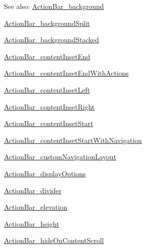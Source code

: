 \begin{Desc}
\item[See also:]\hyperlink{classandroid_1_1support_1_1v4_1_1_r_1_1styleable_7d91fb5bbb5c3d2bc5aec28f9ed002b4}{ActionBar\_\-background} 

\hyperlink{classandroid_1_1support_1_1v4_1_1_r_1_1styleable_94fcfd07399863e568786b26bbb3deed}{ActionBar\_\-backgroundSplit} 

\hyperlink{classandroid_1_1support_1_1v4_1_1_r_1_1styleable_afd1ae650dce54259899787ed8768401}{ActionBar\_\-backgroundStacked} 

\hyperlink{classandroid_1_1support_1_1v4_1_1_r_1_1styleable_2fc65202296211aca68d2f909690758f}{ActionBar\_\-contentInsetEnd} 

\hyperlink{classandroid_1_1support_1_1v4_1_1_r_1_1styleable_8f6d660506a9045530ddc8d45a060796}{ActionBar\_\-contentInsetEndWithActions} 

\hyperlink{classandroid_1_1support_1_1v4_1_1_r_1_1styleable_22de0174bc46d66158777df4487ee6d2}{ActionBar\_\-contentInsetLeft} 

\hyperlink{classandroid_1_1support_1_1v4_1_1_r_1_1styleable_c4907643708a044aecdbc76049dc1be0}{ActionBar\_\-contentInsetRight} 

\hyperlink{classandroid_1_1support_1_1v4_1_1_r_1_1styleable_4b97a1950d9a8efde8b222a7b18c7301}{ActionBar\_\-contentInsetStart} 

\hyperlink{classandroid_1_1support_1_1v4_1_1_r_1_1styleable_b66f0db25dbaa8260940ed3b91d9d0c5}{ActionBar\_\-contentInsetStartWithNavigation} 

\hyperlink{classandroid_1_1support_1_1v4_1_1_r_1_1styleable_f3b2158180d9362405027a8913901587}{ActionBar\_\-customNavigationLayout} 

\hyperlink{classandroid_1_1support_1_1v4_1_1_r_1_1styleable_60b6f63f434384dc991ae78a8335cef3}{ActionBar\_\-displayOptions} 

\hyperlink{classandroid_1_1support_1_1v4_1_1_r_1_1styleable_d827f43a76e4f9b7a6f0459ff2a4b5b8}{ActionBar\_\-divider} 

\hyperlink{classandroid_1_1support_1_1v4_1_1_r_1_1styleable_0516184b1cd0e4ef27327318c1bdc7c4}{ActionBar\_\-elevation} 

\hyperlink{classandroid_1_1support_1_1v4_1_1_r_1_1styleable_e9d68fc513f852dd01e0da8392efa4d1}{ActionBar\_\-height} 

\hyperlink{classandroid_1_1support_1_1v4_1_1_r_1_1styleable_d0bacf654ec88cf7bbf7f62214466f22}{ActionBar\_\-hideOnContentScroll} 


\end{Desc}
